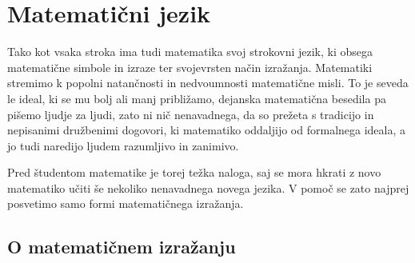 \chapter{Matematični jezik}
\label{cha:matematicni-jezik}

Tako kot vsaka stroka ima tudi matematika svoj strokovni jezik, ki obsega matematične
simbole in izraze ter svojevrsten način izražanja. Matematiki stremimo k popolni
natančnosti in nedvoumnosti matematične misli. To je seveda le ideal, ki se mu bolj ali
manj približamo, dejanska matematična besedila pa pišemo ljudje za ljudi, zato ni nič
nenavadnega, da so prežeta s tradicijo in nepisanimi družbenimi dogovori, ki matematiko
oddaljijo od formalnega ideala, a jo tudi naredijo ljudem razumljivo in zanimivo.

Pred študentom matematike je torej težka naloga, saj se mora hkrati z novo matematiko
učiti še nekoliko nenavadnega novega jezika. V pomoč se zato najprej posvetimo samo
formi matematičnega izražanja.

\section{O matematičnem izražanju}
\label{sec:o-matematicnem-izrazanju}

% 
% 
% 
% 

